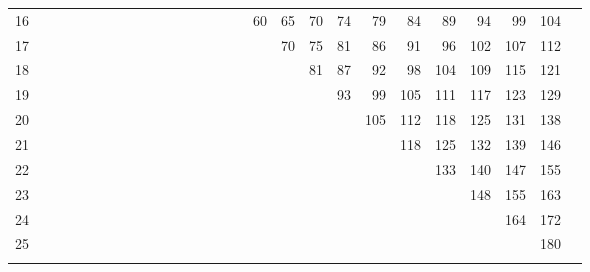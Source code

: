 \begin{table}[H]
{\begin{tabular}[t]{*{27}{r}}
16 &  &  &  &  &  &  &  &  &  &  &  &  &  &  &  & 60 & 65 & 70 & 74 & 79 & 84 & 89 & 94 & 99 & 104\\
17 &  &  &  &  &  &  &  &  &  &  &  &  &  &  &  &  & 70 & 75 & 81 & 86 & 91 & 96 & 102 & 107 & 112\\
18 &  &  &  &  &  &  &  &  &  &  &  &  &  &  &  &  &  & 81 & 87 & 92 & 98 & 104 & 109 & 115 & 121\\
19 &  &  &  &  &  &  &  &  &  &  &  &  &  &  &  &  &  &  & 93 & 99 & 105 & 111 & 117 & 123 & 129\\
20 &  &  &  &  &  &  &  &  &  &  &  &  &  &  &  &  &  &  &  & 105 & 112 & 118 & 125 & 131 & 138\\
21 &  &  &  &  &  &  &  &  &  &  &  &  &  &  &  &  &  &  &  &  & 118 & 125 & 132 & 139 & 146\\
22 &  &  &  &  &  &  &  &  &  &  &  &  &  &  &  &  &  &  &  &  &  & 133 & 140 & 147 & 155\\
23 &  &  &  &  &  &  &  &  &  &  &  &  &  &  &  &  &  &  &  &  &  &  & 148 & 155 & 163\\
24 &  &  &  &  &  &  &  &  &  &  &  &  &  &  &  &  &  &  &  &  &  &  &  & 164 & 172\\
25 &  &  &  &  &  &  &  &  &  &  &  &  &  &  &  &  &  &  &  &  &  &  &  &  & 180\\
\lspbottomrule
\end{tabular}}
\end{table}
\largerpage[2]

